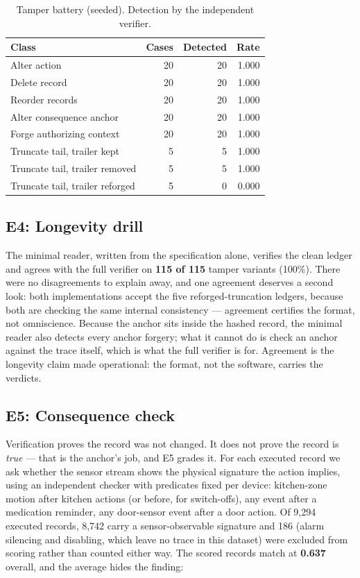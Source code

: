 \documentclass[journal]{IEEEtran}
\begin{document}
\begin{table}[!t]
\caption{Tamper battery (seeded). Detection by the independent verifier.}
\label{tab:tamper}
\centering
\begin{tabular}{lrrr}
\toprule
Class & Cases & Detected & Rate \\
\midrule
Alter action & 20 & 20 & 1.000 \\
Delete record & 20 & 20 & 1.000 \\
Reorder records & 20 & 20 & 1.000 \\
Alter consequence anchor & 20 & 20 & 1.000 \\
Forge authorizing context & 20 & 20 & 1.000 \\
Truncate tail, trailer kept & 5 & 5 & 1.000 \\
Truncate tail, trailer removed & 5 & 5 & 1.000 \\
Truncate tail, trailer reforged & 5 & 0 & 0.000 \\
\bottomrule
\end{tabular}
\end{table}

\subsection{E4: Longevity drill}

The minimal reader, written from the specification alone, verifies the
clean ledger and agrees with the full verifier on
\textbf{115 of 115} tamper variants (100\%). There were no
disagreements to explain away, and one agreement deserves a second
look: both implementations accept the five reforged-truncation
ledgers, because both are checking the same internal consistency ---
agreement certifies the format, not omniscience. Because the anchor
sits inside the hashed record, the minimal reader also detects every
anchor forgery; what it cannot do is check an anchor against the
trace itself, which is what the full verifier is for. Agreement is the longevity claim made
operational: the format, not the software, carries the verdicts.

\subsection{E5: Consequence check}

Verification proves the record was not changed. It does not prove the
record is \emph{true} --- that is the anchor's job, and E5 grades it.
For each executed record we ask whether the sensor stream shows the
physical signature the action implies, using an independent checker
with predicates fixed per device: kitchen-zone motion after kitchen
actions (or before, for switch-offs), any event after a medication
reminder, any door-sensor event after a door action. Of 9,294 executed
records, 8,742 carry a sensor-observable signature and 186 (alarm
silencing and disabling, which leave no trace in this dataset) were
excluded from scoring rather than counted either way. The scored
records match at \textbf{0.637} overall, and the average hides the
finding:
\end{document}
